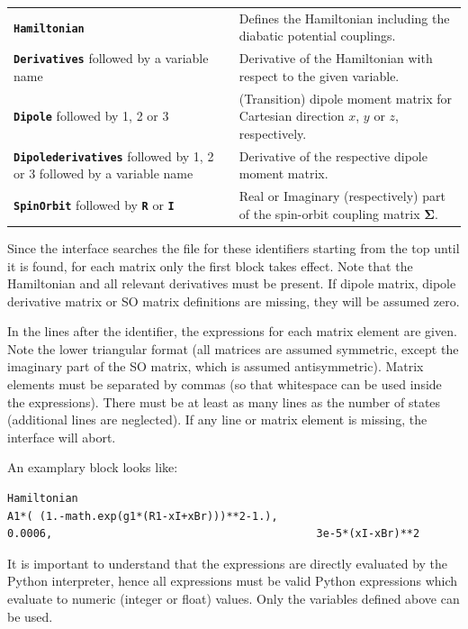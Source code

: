 \documentclass[a4paper,10pt,DIV=15,openany,twoside=false]{scrbook}
\newcommand{\ttt}[1]{\textbf{\texttt{#1}}}
\newenvironment{example}{
  \setlength{\OuterFrameSep}{3pt}
  \vspace{0mm}
  \definecolor{shadecolor}{HTML}{E4F4FF}
  \begin{shaded}
}{
  \end{shaded}
}
\begin{document}
\begin{tabular}{p{5cm}p{9cm}}
\ttt{Hamiltonian}                               &Defines the Hamiltonian including the diabatic potential couplings.\\
\ttt{Derivatives} followed by a variable name   &Derivative of the Hamiltonian with respect to the given variable.\\
\ttt{Dipole} followed by 1, 2 or 3              &(Transition) dipole moment matrix for Cartesian direction $x$, $y$ or $z$, respectively.\\
\ttt{Dipolederivatives} followed by 1, 2 or 3 followed by a variable name       &Derivative of the respective dipole moment matrix.\\
\ttt{SpinOrbit} followed by \ttt{R} or \ttt{I}  &Real or Imaginary (respectively) part of the spin-orbit coupling matrix $\boldsymbol{\Sigma}$.\\
\end{tabular}

Since the interface searches the file for these identifiers starting from the top until it is found, for each matrix only the first block takes effect. Note that the Hamiltonian and all relevant derivatives must be present. If dipole matrix, dipole derivative matrix or SO matrix definitions are missing, they will be assumed zero.

In the lines after the identifier, the expressions for each matrix element are given. Note the lower triangular format (all matrices are assumed symmetric, except the imaginary part of the SO matrix, which is assumed antisymmetric). Matrix elements must be separated by commas (so that whitespace can be used inside the expressions). There must be at least as many lines as the number of states (additional lines are neglected). If any line or matrix element is missing, the interface will abort.

An examplary block looks like:
\begin{example}
  \begin{verbatim}
Hamiltonian
A1*( (1.-math.exp(g1*(R1-xI+xBr)))**2-1.),
0.0006,                                         3e-5*(xI-xBr)**2
\end{verbatim}
\end{example}
It is important to understand that the expressions are directly evaluated by the Python interpreter, hence all expressions must be valid Python expressions which evaluate to numeric (integer or float) values. Only the variables defined above can be used. 
\end{document}
